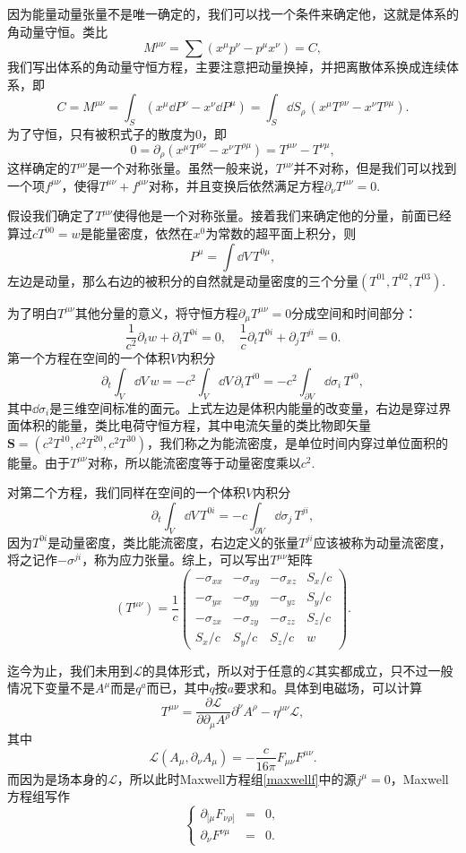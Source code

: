 \documentclass[10pt]{book}
\begin{document}
因为能量动量张量不是唯一确定的，我们可以找一个条件来确定他，这就是体系的角动量守恒。类比
\[
	M^{\mu\nu}=\sum (x^\mu p^\nu-p^\mu x^\nu)=C,
\]
我们写出体系的角动量守恒方程，主要注意把动量换掉，并把离散体系换成连续体系，即
\[
	C=M^{\mu\nu}=\int_S (x^\mu \dd P^\nu-x^\nu\dd P^\mu)=\int_S\dd S_\rho\, (x^\mu T^{\rho\nu}-x^\nu T^{\rho\mu}).
\]
为了守恒，只有被积式子的散度为0，即
\[
	0=\partial_\rho(x^\mu T^{\rho\nu}-x^\nu T^{\rho\mu})=T^{\mu\nu}-T^{\nu\mu},
\]
这样确定的$T^{\mu\nu}$是一个对称张量。虽然一般来说，$T^{\mu\nu}$并不对称，但是我们可以找到一个项$f^{\mu\nu}$，使得$T^{\mu\nu}+f^{\mu\nu}$对称，并且变换后依然满足方程$\partial_\nu T^{\mu\nu}=0$.

假设我们确定了$T^{\mu\nu}$使得他是一个对称张量。接着我们来确定他的分量，前面已经算过$cT^{00}=w$是能量密度，依然在$x^0$为常数的超平面上积分，则
\[
	P^\mu=\int \dd V\,T^{0 \mu},
\]
左边是动量，那么右边的被积分的自然就是动量密度的三个分量$\left(T^{01},T^{02},T^{03}\right)$.

为了明白$T^{\mu\nu}$其他分量的意义，将守恒方程$\partial_\mu T^{\mu\nu}=0$分成空间和时间部分：
\[
	\frac{1}{c^2}\partial_t w+\partial_i T^{0i}=0,\quad \frac{1}{c}\partial_t T^{0i}+\partial_j T^{ji}=0.
\]
第一个方程在空间的一个体积$V$内积分
\[
	\partial_t\int_V \dd V\,w=-c^2\int_{V}\dd V\,\partial_i T^{i0} =-c^2\int_{\partial V}\dd\sigma_i\,T^{i0},
\]
其中$\dd\sigma_i$是三维空间标准的面元。上式左边是体积内能量的改变量，右边是穿过界面体积的能量，类比电荷守恒方程，其中电流矢量的类比物即矢量$\bm{S}=(c^2T^{10},c^2T^{20},c^2T^{30})$，我们称之为能流密度，是单位时间内穿过单位面积的能量。由于$T^{\mu\nu}$对称，所以能流密度等于动量密度乘以$c^2$.

对第二个方程，我们同样在空间的一个体积$V$内积分
\[
	\partial_t\int_V \dd V\,T^{0i}=-c\int_{\partial V}\dd\sigma_j\,T^{ji},
\]
因为$T^{0i}$是动量密度，类比能流密度，右边定义的张量$T^{ji}$应该被称为动量流密度，将之记作$-\sigma^{ji}$，称为应力张量。综上，可以写出$T^{\mu\nu}$矩阵
\[
	(T^{\mu\nu})=\frac{1}{c}
	\begin{pmatrix}
	-\sigma_{xx}&-\sigma_{xy}&-\sigma_{xz}&S_x/c\\
	-\sigma_{yx}&-\sigma_{yy}&-\sigma_{yz}&S_y/c\\
	-\sigma_{zx}&-\sigma_{zy}&-\sigma_{zz}&S_z/c\\
	S_x/c&S_y/c&S_z/c&w
	\end{pmatrix}.
\]

迄今为止，我们未用到$\mathcal{L}$的具体形式，所以对于任意的$\mathcal{L}$其实都成立，只不过一般情况下变量不是$A^\mu$而是$q^a$而已，其中$q$按$a$要求和。具体到电磁场，可以计算
\[
	T^{\mu\nu}=\frac{\partial \mathcal{L}}{\partial \partial_\mu A^\rho}\partial^\nu A^\rho-\eta^{\mu\nu} \mathcal{L},
\]
其中
\[
	\mathcal{L}(A_\mu,\partial_\nu A_\mu)=-\frac{c}{16\pi}F_{\mu\nu}F^{\mu\nu}.
\]
而因为是场本身的$\mathcal{L}$，所以此时Maxwell方程组\eqref{maxwellf}中的源$j^\mu=0$，Maxwell方程组写作
\[
\left\{
\begin{array}{lcl}
	\partial_{[\mu}F_{\nu\rho]}&=&0,\\
	\partial_\nu F^{\nu\mu}&=&0.
\end{array}
\right.
\]
\end{document}
